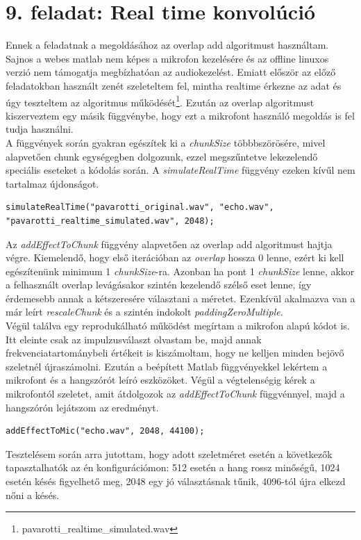 \documentclass{article}
\begin{document}
\section*{9. feladat: Real time konvolúció}
	Ennek a feladatnak a megoldásához az overlap add algoritmust használtam. Sajnos a webes matlab nem képes a mikrofon kezelésére és az offline linuxos verzió nem támogatja megbízhatóan az audiokezelést. Emiatt először az előző feladatokban használt zenét szeleteltem fel, mintha realtime érkezne az adat és úgy teszteltem az algoritmus működését\footnote{pavarotti\_realtime\_simulated.wav}. Ezután az overlap algoritmust kiszerveztem egy másik függvénybe, hogy ezt a mikrofont használó megoldás is fel tudja használni. \\
	A függvények során gyakran egészítek ki a \textit{chunkSize} többbszörösére, mivel alapvetően chunk egységegben dolgozunk, ezzel megszűntetve lekezelendő speciális eseteket a kódolás során. A \textit{simulateRealTime} függvény ezeken kívűl nem tartalmaz újdonságot.
	\begin{lstlisting}
simulateRealTime("pavarotti_original.wav", "echo.wav", "pavarotti_realtime_simulated.wav", 2048);
	\end{lstlisting}
	
	Az \textit{addEffectToChunk} függvény alapvetően az overlap add algoritmust hajtja végre. Kiemelendő, hogy első iterációban az \textit{overlap} hossza $0$ lenne, ezért ki kell egészítenünk minimum 1 \textit{chunkSize}-ra. Azonban ha pont 1 \textit{chunkSize} lenne, akkor a felhasznált overlap levágásakor szintén kezelendő szélső eset lenne, így érdemesebb annak a kétszeresére választani a méretet. Ezenkívül akalmazva van a már leírt \textit{rescaleChunk} és a szintén indokolt \textit{paddingZeroMultiple}. \\
	
	Végül találva egy reprodukálható működést megírtam a mikrofon alapú kódot is. Itt eleinte csak az impulzusválaszt olvastam be, majd annak frekvenciatartománybeli értékeit is kiszámoltam, hogy ne kelljen minden bejövő szeletnél újraszámolni. Ezután a beépített Matlab függvényekkel lekértem a mikrofont és a hangszórót leíró eszközöket. Végül a végtelenségig kérek a mikrofontól szeletet, amit átdolgozok az \textit{addEffectToChunk} függvénnyel, majd a hangszórón lejátszom az eredményt.
	\begin{lstlisting}
addEffectToMic("echo.wav", 2048, 44100);
	\end{lstlisting}
	
	Tesztelésem során arra jutottam, hogy adott szeletméret esetén a következők tapasztalhatók az én konfigurációmon: 512 esetén a hang rossz minőségű, 1024 esetén késés figyelhető meg, 2048 egy jó választásnak tűnik, 4096-tól újra elkezd nőni a késés.

\end{document}
